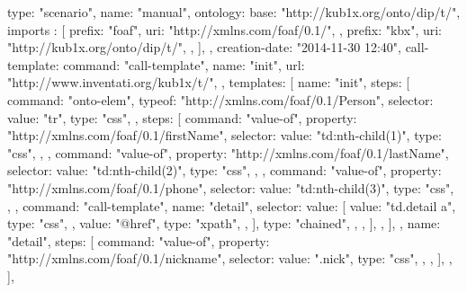 \begtt
{
  type: "scenario", 
  name: "manual", 
  ontology: {
    base: "http://kub1x.org/onto/dip/t/", 
    imports : [
      {
        prefix: "foaf", 
        uri: "http://xmlns.com/foaf/0.1/", 
      }, 
      {
        prefix: "kbx", 
        uri: "http://kub1x.org/onto/dip/t/", 
      }, 
    ], 
  }, 
  creation-date: "2014-11-30 12:40", 
  call-template: {
    command: "call-template", 
    name: "init", 
    url: "http://www.inventati.org/kub1x/t/", 
  }, 
  templates: [
    {
      name: "init", 
      steps: [
        {
          command: "onto-elem", 
          typeof: "http://xmlns.com/foaf/0.1/Person", 
          selector: {
            value: "tr", 
            type: "css", 
          }, 
          steps: [
            {
              command: "value-of", 
              property: "http://xmlns.com/foaf/0.1/firstName", 
              selector: {
                value: "td:nth-child(1)", 
                type: "css", 
              }, 
            }, 
            {
              command: "value-of", 
              property: "http://xmlns.com/foaf/0.1/lastName", 
              selector: {
                value: "td:nth-child(2)", 
                type:  "css", 
              }, 
            }, 
            {
              command: "value-of", 
              property: "http://xmlns.com/foaf/0.1/phone", 
              selector: {
                value: "td:nth-child(3)", 
                type:  "css", 
              }, 
            },
            {
              command: "call-template", 
              name: "detail", 
              selector: {
                value: [
                  {
                    value: "td.detail a", 
                    type:  "css", 
                  }, 
                  {
                    value: "@href", 
                    type: "xpath", 
                  }, 
                ], 
                type: "chained", 
              }, 
            }, 
          ], 
        }, 
      ], 
    }, 
    {
      name: "detail", 
      steps: [
        {
          command: "value-of", 
          property: "http://xmlns.com/foaf/0.1/nickname", 
          selector: {
            value: ".nick", 
            type:  "css", 
          }, 
        },
      ], 
    }, 
  ], 
}
\endtt




